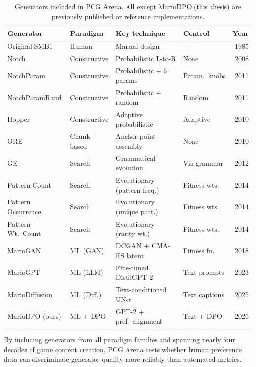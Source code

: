 \documentclass[shortabstract, mgr, english]{iithesis}
\begin{document}
\begin{table}[H]
\centering
\footnotesize
\begin{tabular}{@{} l l l l r @{}}
\toprule
\textbf{Generator} & \textbf{Paradigm} & \textbf{Key technique} & \textbf{Control} & \textbf{Year} \\
\midrule
Original SMB1      & Human        & Manual design               & ---            & 1985 \\
Notch              & Constructive & Probabilistic L-to-R        & None           & 2008 \\
NotchParam         & Constructive & Probabilistic + 6 params    & Param.\ knobs  & 2011 \\
NotchParamRand     & Constructive & Probabilistic + random      & Random         & 2011 \\
Hopper             & Constructive & Adaptive probabilistic      & Adaptive       & 2010 \\
ORE                & Chunk-based  & Anchor-point assembly       & None           & 2010 \\
GE                 & Search       & Grammatical evolution       & Via grammar    & 2012 \\
Pattern Count      & Search       & Evolutionary (pattern freq.)& Fitness wts.   & 2014 \\
Pattern Occurrence & Search       & Evolutionary (unique patt.) & Fitness wts.   & 2014 \\
Pattern Wt.\ Count & Search       & Evolutionary (rarity-wt.)   & Fitness wts.   & 2014 \\
MarioGAN           & ML (GAN)     & DCGAN + CMA-ES latent       & Fitness fn.    & 2018 \\
MarioGPT           & ML (LLM)     & Fine-tuned DistilGPT-2      & Text prompts   & 2023 \\
MarioDiffusion     & ML (Diff.)   & Text-conditioned UNet       & Text captions  & 2025 \\
MarioDPO (ours)    & ML + DPO     & GPT-2 + pref.\ alignment    & Text + DPO     & 2026 \\
\bottomrule
\end{tabular}
\caption{Generators included in PCG Arena. All except MarioDPO (this thesis) are
previously published or reference implementations.}
\label{tab:generators}
\end{table}

By including generators from all paradigm families and spanning nearly four
decades of game content creation, PCG Arena tests whether human preference data
can discriminate generator quality more reliably than automated metrics.
\end{document}
